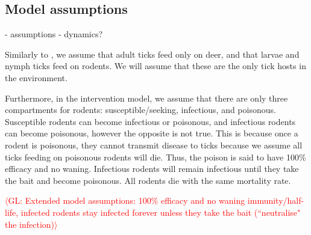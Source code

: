 \documentclass[12pt, centerh1]{article}
\newcommand{\geneva}[1]{{\textcolor{red}{$\langle$GL: #1$\rangle$}}}
\begin{document}
\subsection{Model assumptions}
- assumptions
- dynamics?

Similarly to \citet{lou2014tick}, we assume that adult ticks feed only on deer, and that larvae and nymph ticks feed on rodents. We will assume that these are the only tick hosts in the environment.

Furthermore, in the intervention model, we assume that there are only three compartments for rodents: susceptible/seeking, infectious, and poisonous. Susceptible rodents can become infectious or poisonous, and infectious rodents can become poisonous, however the opposite is not true. This is because once a rodent is poisonous, they cannot transmit disease to ticks because we assume all ticks feeding on poisonous rodents will die. Thus, the poison is said to have 100\% efficacy and no waning. Infectious rodents will remain infectious until they take the bait and become poisonous. All rodents die with the same mortality rate.

\geneva{Extended model assumptions: 100\% efficacy and no waning immunity/half-life, infected rodents stay infected forever unless they take the bait (``neutralise" the infection)}
\begin{center}
\begin{table}[h!]
\footnotesize
\noindent{}
\end{table}
\end{center}
\end{document}
